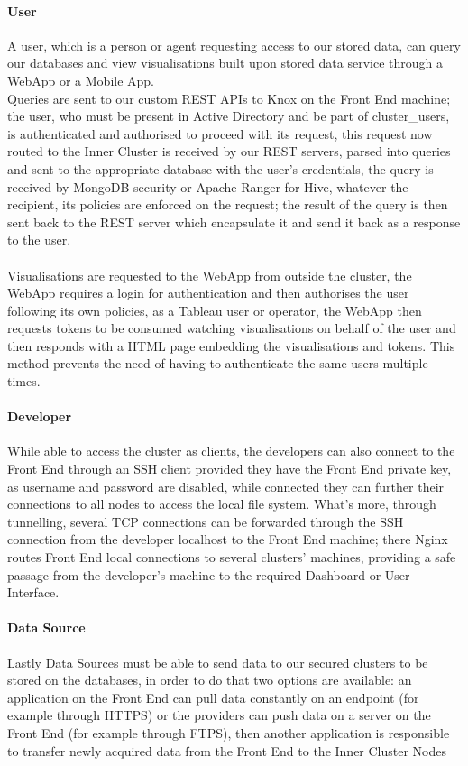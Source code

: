 \paragraph{User}
A user, which is a person or agent requesting access to our stored data, can query our databases and view visualisations built upon stored data service through a WebApp or a Mobile App.\\
Queries are sent to our custom REST APIs to Knox on the Front End machine; the user, who must be present in Active Directory and be part of cluster\_users, is authenticated and authorised to proceed with its request, this request now routed to the Inner Cluster is received by our REST servers, parsed into queries and sent to the appropriate database with the user's credentials, the query is received by MongoDB security or Apache Ranger for Hive, whatever the recipient, its policies are enforced on the request; the result of the query is then sent back to the REST server which encapsulate it and send it back as a response to the user.
\\ \\
Visualisations are requested to the WebApp from outside the cluster, the WebApp requires a login for authentication and then authorises the user following its own policies, as a Tableau user or operator, the WebApp then requests tokens to be consumed watching visualisations on behalf of the user and then responds with a HTML page embedding the visualisations and tokens. This method prevents the need of having to authenticate the same users multiple times.
\paragraph{Developer}
While able to access the cluster as clients, the developers can also connect to the Front End through an SSH client provided they have the Front End private key, as username and password are disabled, while connected they can further their connections to all nodes to access the local file system. What's more, through tunnelling, several TCP connections can be forwarded through the SSH connection from the developer localhost to the Front End machine; there Nginx routes Front End local connections to several clusters' machines, providing a safe passage from the developer's machine to the required Dashboard or User Interface.
\paragraph{Data Source}
Lastly Data Sources must be able to send data to our secured clusters to be stored on the databases, in order to do that two options are available: an application on the Front End can pull data constantly on an endpoint (for example through HTTPS) or the providers can push data on a server on the Front End (for example through FTPS), then another application is responsible to transfer newly acquired data from the Front End to the Inner Cluster Nodes